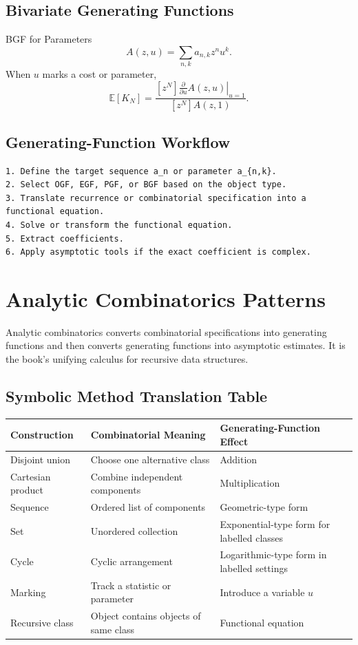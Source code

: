 \documentclass[11pt]{article}
\newcommand{\E}{\mathbb{E}}
\begin{document}
\subsection{Bivariate Generating Functions}

\begin{mathbox}{BGF for Parameters}
\[
A(z,u)=\sum_{n,k}a_{n,k}z^nu^k.
\]
When \(u\) marks a cost or parameter,
\[
\E[K_N]
=
\frac{[z^N]\left.\frac{\partial}{\partial u}A(z,u)\right|_{u=1}}
{[z^N]A(z,1)}.
\]
\end{mathbox}

\subsection{Generating-Function Workflow}

\begin{verbatim}
1. Define the target sequence a_n or parameter a_{n,k}.
2. Select OGF, EGF, PGF, or BGF based on the object type.
3. Translate recurrence or combinatorial specification into a functional equation.
4. Solve or transform the functional equation.
5. Extract coefficients.
6. Apply asymptotic tools if the exact coefficient is complex.
\end{verbatim}

\section{Analytic Combinatorics Patterns}

Analytic combinatorics converts combinatorial specifications into generating functions and then converts generating functions into asymptotic estimates. It is the book's unifying calculus for recursive data structures.

\subsection{Symbolic Method Translation Table}

\begin{center}
\begin{tabularx}{\textwidth}{L{0.24\textwidth} L{0.25\textwidth} Y}
\toprule
\textbf{Construction} & \textbf{Combinatorial Meaning} & \textbf{Generating-Function Effect} \\
\midrule
Disjoint union & Choose one alternative class & Addition \\
Cartesian product & Combine independent components & Multiplication \\
Sequence & Ordered list of components & Geometric-type form \\
Set & Unordered collection & Exponential-type form for labelled classes \\
Cycle & Cyclic arrangement & Logarithmic-type form in labelled settings \\
Marking & Track a statistic or parameter & Introduce a variable \(u\) \\
Recursive class & Object contains objects of same class & Functional equation \\
\bottomrule
\end{tabularx}
\end{center}
\end{document}
